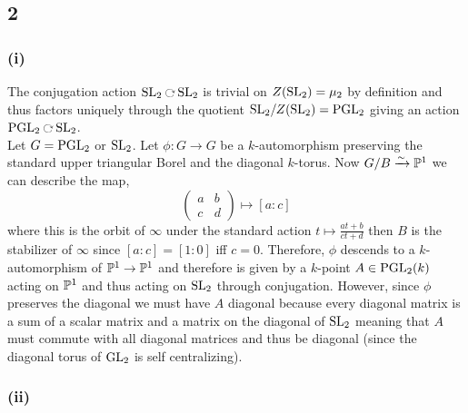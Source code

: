 \documentclass[12pt]{article}
\begin{document}
\subsection{2}

\subsubsection{(i)}

The conjugation action $\SL_2 \acts \SL_2$ is trivial on $Z(\SL_2) = \mu_2$ by definition and thus factors uniquely through the quotient $\SL_2 / Z(\SL_2) = \PGL_2$ giving an action $\PGL_2 \acts \SL_2$.
\bigskip\\
Let $G = \PGL_2$ or $\SL_2$. Let $\phi : G \to G$ be a $k$-automorphism preserving the standard upper triangular Borel and the diagonal $k$-torus. Now $G / B \iso \P^1$ we can describe the map,
\[ \begin{pmatrix}
a & b 
\\
c & d 
\end{pmatrix}
\mapsto [a : c] \]
where this is the orbit of $\infty$ under the standard action $t \mapsto \frac{a t + b}{ct + d}$ then $B$ is the stabilizer of $\infty$ since $[a : c] = [1 : 0]$ iff $c = 0$. Therefore, $\phi$ descends to a $k$-automorphism of $\P^1 \to \P^1$ and therefore is given by a $k$-point $A \in \PGL_2(k)$ acting on $\P^1$ and thus acting on $\SL_2$ through conjugation. However, since $\phi$ preserves the diagonal we must have $A$ diagonal because every diagonal matrix is a sum of a scalar matrix and a matrix on the diagonal of $\SL_2$ meaning that $A$ must commute with all diagonal matrices and thus be diagonal (since the diagonal torus of $\GL_2$ is self centralizing). 

\subsubsection{(ii)}

\renewcommand{\Aut}{\mathrm{Aut}}
\end{document}
